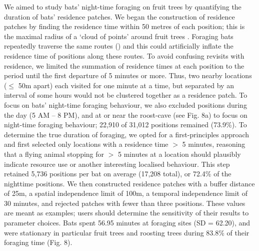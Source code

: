 \begin{refsection}
    We aimed to study bats' night-time foraging on fruit trees by quantifying the duration of bats' residence patches.
    We began the construction of residence patches by finding the residence time within 50 metres of each position; this is the maximal radius of a `cloud of points' around fruit trees \citep{bracis2018}.
    Foraging bats repeatedly traverse the same routes (\citealt{toledo2020, tsoar2011, lourie2021}) and this could artificially inflate the residence time of positions along these routes.
    To avoid confusing revisits with residence, we limited the summation of residence times at each position to the period until the first departure of 5 minutes or more.
    Thus, two nearby locations ($\leq$ 50m apart) each visited for one minute at a time, but separated by an interval of some hours would not be clustered together as a residence patch. 
    To focus on bats' night-time foraging behaviour, we also excluded positions during the day (5 AM -- 8 PM), and at or near the roost-cave (see Fig. 8a) to focus on night-time foraging behaviour; 22,910 of 31,012 positions remained (73.9\%).
    To determine the true duration of foraging, we opted for a first-principles approach and first selected only locations with a residence time $>$ 5 minutes, reasoning that a flying animal stopping for $>$ 5 minutes at a location should plausibly indicate resource use or another interesting localised behaviour.
    This step retained 5,736 positions per bat on average (17,208 total), or 72.4\% of the nighttime positions.
    We then constructed residence patches with a buffer distance of 25m, a spatial independence limit of 100m, a temporal independence limit of 30 minutes, and rejected patches with fewer than three positions.
    These values are meant as examples; users should determine the sensitivity of their results to parameter choices.
    Bats spent 56.95 minutes at foraging sites (SD = 62.20), and were stationary in particular fruit trees and roosting trees during 83.8\% of their foraging time (Fig. 8).

\end{refsection}
